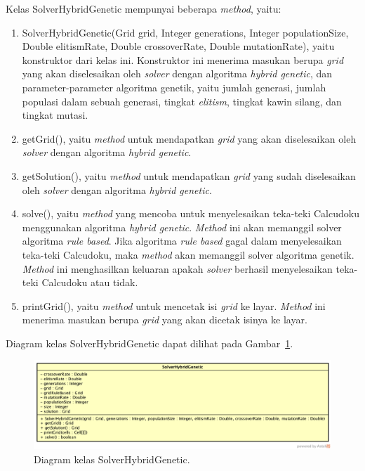 Kelas SolverHybridGenetic mempunyai beberapa \textit{method}, yaitu:

\begin{enumerate}
\item SolverHybridGenetic(Grid grid, Integer generations, Integer populationSize, Double elitismRate, Double crossoverRate, Double mutationRate), yaitu konstruktor dari kelas ini. Konstruktor ini menerima masukan berupa \textit{grid} yang akan diselesaikan oleh \textit{solver} dengan algoritma \textit{hybrid genetic}, dan parameter-parameter algoritma genetik, yaitu jumlah generasi, jumlah populasi dalam sebuah generasi, tingkat \textit{elitism}, tingkat kawin silang, dan tingkat mutasi.
\item getGrid(), yaitu \textit{method} untuk mendapatkan \textit{grid} yang akan diselesaikan oleh \textit{solver} dengan algoritma \textit{hybrid genetic}.
\item getSolution(), yaitu \textit{method} untuk mendapatkan \textit{grid} yang sudah diselesaikan oleh \textit{solver} dengan algoritma \textit{hybrid genetic}.
\item solve(), yaitu \textit{method} yang mencoba untuk menyelesaikan teka-teki Calcudoku menggunakan algoritma \textit{hybrid genetic}. \textit{Method} ini akan memanggil solver algoritma \textit{rule based}. Jika algoritma \textit{rule based} gagal dalam menyelesaikan teka-teki Calcudoku, maka \textit{method} akan memanggil solver algoritma genetik. \textit{Method} ini menghasilkan keluaran apakah \textit{solver} berhasil menyelesaikan teka-teki Calcudoku atau tidak.
\item printGrid(), yaitu \textit{method} untuk mencetak isi \textit{grid} ke layar. \textit{Method} ini menerima masukan berupa \textit{grid} yang akan dicetak isinya ke layar.

\end{enumerate}

Diagram kelas SolverHybridGenetic dapat dilihat pada Gambar~\ref{fig:diagramkelassolverhg}.

\begin{figure}
\centering
\captionsetup{justification=centering}
\includegraphics[scale=0.333]{Gambar/Perancangan/DiagramKelasSolverHybridGenetic.png}
\caption[Diagram kelas SolverHybridGenetic.]{Diagram kelas SolverHybridGenetic.}
\label{fig:diagramkelassolverhg}
\end{figure}

